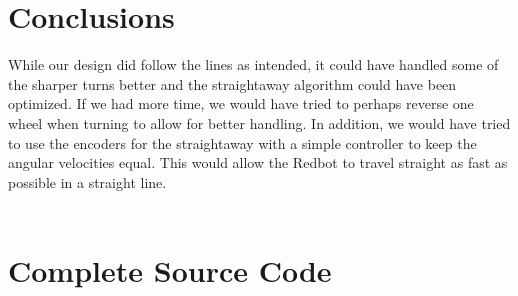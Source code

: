 \documentclass{article}
\begin{document}
\section{Conclusions}
While our design did follow the lines as intended, it could have handled some of the sharper turns better and the straightaway algorithm could have been optimized.  If we had more time, we would have tried to perhaps reverse one wheel when turning to allow for better handling.  In addition, we would have tried to use the encoders for the straightaway with a simple controller to keep the angular velocities equal.  This would allow the Redbot to travel straight as fast as possible in a straight line.
\\\\
\section{Complete Source Code}
\end{document}
